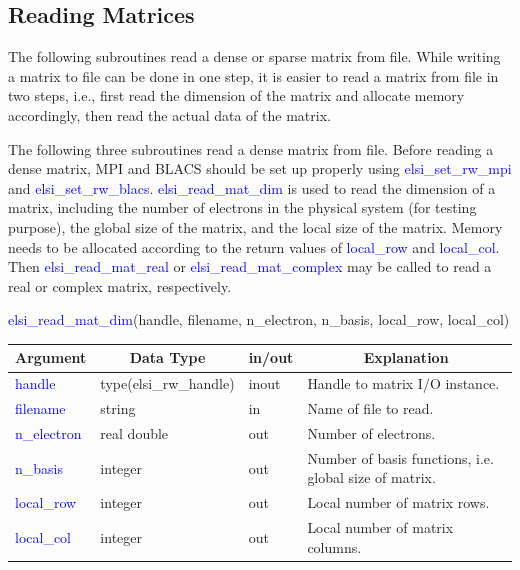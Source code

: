 \documentclass{report}
\begin{document}
\subsection{Reading Matrices}
\label{subsec:rw_read}
The following subroutines read a dense or sparse matrix from file. While writing a matrix to file can be done in one step, it is easier to read a matrix from file in two steps, i.e., first read the dimension of the matrix and allocate memory accordingly, then read the actual data of the matrix.

The following three subroutines read a dense matrix from file. Before reading a dense matrix, MPI and BLACS should be set up properly using \textcolor{blue}{elsi\_set\_rw\_mpi} and \textcolor{blue}{elsi\_set\_rw\_blacs}. \textcolor{blue}{elsi\_read\_mat\_dim} is used to read the dimension of a matrix, including the number of electrons in the physical system (for testing purpose), the global size of the matrix, and the local size of the matrix. Memory needs to be allocated according to the return values of \textcolor{blue}{local\_row} and \textcolor{blue}{local\_col}. Then \textcolor{blue}{elsi\_read\_mat\_real} or \textcolor{blue}{elsi\_read\_mat\_complex} may be called to read a real or complex matrix, respectively.
\begin{labeling}{\hspace{6cm}}
\item [\hspace{0.3cm} \textcolor{blue}{elsi\_read\_mat\_dim}(handle, filename, n\_electron, n\_basis, local\_row, local\_col)]
\end{labeling}

\begin{tabular}[]{|p{20mm}|p{45mm}|p{15mm}|p{85mm}|}
\hline
\multicolumn{1}{|c|}{\textbf{Argument}} & \multicolumn{1}{c|}{\textbf{Data Type}} & \multicolumn{1}{c|}{\textbf{in/out}} & \multicolumn{1}{c|}{\textbf{Explanation}}\\
\hline
\textcolor{blue}{handle}      & type(elsi\_rw\_handle) & inout & Handle to matrix I/O instance.\\
\hline
\textcolor{blue}{filename}    & string                 & in    & Name of file to read.\\
\hline
\textcolor{blue}{n\_electron} & real double            & out   & Number of electrons.\\
\hline
\textcolor{blue}{n\_basis}    & integer                & out   & Number of basis functions, i.e. global size of matrix.\\
\hline
\textcolor{blue}{local\_row}  & integer                & out   & Local number of matrix rows.\\
\hline
\textcolor{blue}{local\_col}  & integer                & out   & Local number of matrix columns.\\
\hline
\end{tabular}
\end{document}
